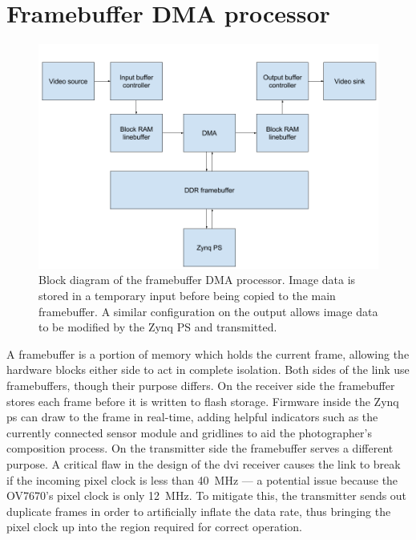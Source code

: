 \section{Framebuffer DMA processor}
\label{sec:framebuffer_dma}

\begin{figure}
  \centering
  \includegraphics[width=1\textwidth]{./img/framebuffer_block_diagram.png}
  \caption{Block diagram of the framebuffer DMA processor. Image data is stored in a temporary input before being copied to the main framebuffer. A similar configuration on the output allows image data to be modified by the Zynq PS and transmitted.}
  \label{fig:framebuffer_block_diagram}
\end{figure}

A framebuffer is a portion of memory which holds the current frame, allowing the hardware blocks either side to act in complete isolation. Both sides of the link use framebuffers, though their purpose differs. On the receiver side the framebuffer stores each frame before it is written to flash storage. Firmware inside the Zynq \gls{ps}  can draw to the frame in real-time, adding helpful indicators such as the currently connected sensor module and gridlines to aid the photographer's composition process. On the transmitter side the framebuffer serves a different purpose. A critical flaw in the design of the \gls{dvi} receiver causes the link to break if the incoming pixel clock is less than \SI{40}{\mega\hertz} --- a potential issue because the OV7670's pixel clock is only \SI{12}{\mega\hertz}. To mitigate this, the transmitter sends out duplicate frames in order to artificially inflate the data rate, thus bringing the pixel clock up into the region required for correct operation.

